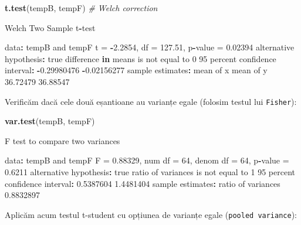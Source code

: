 \documentclass[]{article}
\newenvironment{Shaded}{\begin{snugshade}}{\end{snugshade}}
\newcommand{\KeywordTok}[1]{\textcolor[rgb]{0.13,0.29,0.53}{\textbf{#1}}}
\newcommand{\DecValTok}[1]{\textcolor[rgb]{0.00,0.00,0.81}{#1}}
\newcommand{\FloatTok}[1]{\textcolor[rgb]{0.00,0.00,0.81}{#1}}
\newcommand{\StringTok}[1]{\textcolor[rgb]{0.31,0.60,0.02}{#1}}
\newcommand{\CommentTok}[1]{\textcolor[rgb]{0.56,0.35,0.01}{\textit{#1}}}
\newcommand{\ControlFlowTok}[1]{\textcolor[rgb]{0.13,0.29,0.53}{\textbf{#1}}}
\newcommand{\OperatorTok}[1]{\textcolor[rgb]{0.81,0.36,0.00}{\textbf{#1}}}
\newcommand{\NormalTok}[1]{#1}
\begin{document}
\begin{Shaded}
\begin{Highlighting}[]
\KeywordTok{t.test}\NormalTok{(tempB, tempF) }\CommentTok{# Welch correction }

\NormalTok{    Welch Two Sample t}\OperatorTok{-}\NormalTok{test}

\NormalTok{data}\OperatorTok{:}\StringTok{  }\NormalTok{tempB and tempF}
\NormalTok{t =}\StringTok{ }\OperatorTok{-}\FloatTok{2.2854}\NormalTok{, df =}\StringTok{ }\FloatTok{127.51}\NormalTok{, p}\OperatorTok{-}\NormalTok{value =}\StringTok{ }\FloatTok{0.02394}
\NormalTok{alternative hypothesis}\OperatorTok{:}\StringTok{ }\NormalTok{true difference }\ControlFlowTok{in}\NormalTok{ means is not equal to }\DecValTok{0}
\DecValTok{95}\NormalTok{ percent confidence interval}\OperatorTok{:}
\StringTok{ }\OperatorTok{-}\FloatTok{0.29980476} \OperatorTok{-}\FloatTok{0.02156277}
\NormalTok{sample estimates}\OperatorTok{:}
\NormalTok{mean of x mean of y }
 \FloatTok{36.72479}  \FloatTok{36.88547} 
\end{Highlighting}
\end{Shaded}

Verificăm dacă cele două eșantioane au varianțe egale (folosim testul
lui \texttt{Fisher}):

\begin{Shaded}
\begin{Highlighting}[]
\KeywordTok{var.test}\NormalTok{(tempB, tempF)}

\NormalTok{    F test to compare two variances}

\NormalTok{data}\OperatorTok{:}\StringTok{  }\NormalTok{tempB and tempF}
\NormalTok{F =}\StringTok{ }\FloatTok{0.88329}\NormalTok{, num df =}\StringTok{ }\DecValTok{64}\NormalTok{, denom df =}\StringTok{ }\DecValTok{64}\NormalTok{, p}\OperatorTok{-}\NormalTok{value =}\StringTok{ }\FloatTok{0.6211}
\NormalTok{alternative hypothesis}\OperatorTok{:}\StringTok{ }\NormalTok{true ratio of variances is not equal to }\DecValTok{1}
\DecValTok{95}\NormalTok{ percent confidence interval}\OperatorTok{:}
\StringTok{ }\FloatTok{0.5387604} \FloatTok{1.4481404}
\NormalTok{sample estimates}\OperatorTok{:}
\NormalTok{ratio of variances }
         \FloatTok{0.8832897} 
\end{Highlighting}
\end{Shaded}

Aplicăm acum testul t-student cu opțiunea de varianțe egale
(\texttt{pooled\ variance}):
\end{document}
